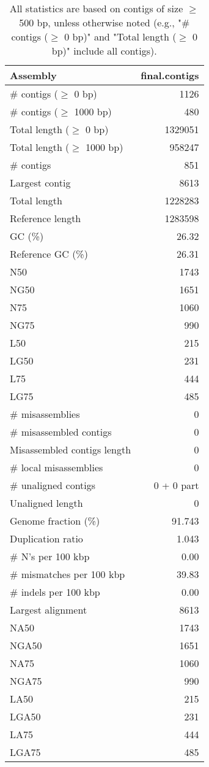 \documentclass[12pt,a4paper]{article}
\begin{document}
\begin{table}[ht]
\begin{center}
\caption{All statistics are based on contigs of size $\geq$ 500 bp, unless otherwise noted (e.g., "\# contigs ($\geq$ 0 bp)" and "Total length ($\geq$ 0 bp)" include all contigs).}
\begin{tabular}{|l*{1}{|r}|}
\hline
Assembly & final.contigs \\ \hline
\# contigs ($\geq$ 0 bp) & 1126 \\ \hline
\# contigs ($\geq$ 1000 bp) & 480 \\ \hline
Total length ($\geq$ 0 bp) & 1329051 \\ \hline
Total length ($\geq$ 1000 bp) & 958247 \\ \hline
\# contigs & 851 \\ \hline
Largest contig & 8613 \\ \hline
Total length & 1228283 \\ \hline
Reference length & 1283598 \\ \hline
GC (\%) & 26.32 \\ \hline
Reference GC (\%) & 26.31 \\ \hline
N50 & 1743 \\ \hline
NG50 & 1651 \\ \hline
N75 & 1060 \\ \hline
NG75 & 990 \\ \hline
L50 & 215 \\ \hline
LG50 & 231 \\ \hline
L75 & 444 \\ \hline
LG75 & 485 \\ \hline
\# misassemblies & 0 \\ \hline
\# misassembled contigs & 0 \\ \hline
Misassembled contigs length & 0 \\ \hline
\# local misassemblies & 0 \\ \hline
\# unaligned contigs & 0 + 0 part \\ \hline
Unaligned length & 0 \\ \hline
Genome fraction (\%) & 91.743 \\ \hline
Duplication ratio & 1.043 \\ \hline
\# N's per 100 kbp & 0.00 \\ \hline
\# mismatches per 100 kbp & 39.83 \\ \hline
\# indels per 100 kbp & 0.00 \\ \hline
Largest alignment & 8613 \\ \hline
NA50 & 1743 \\ \hline
NGA50 & 1651 \\ \hline
NA75 & 1060 \\ \hline
NGA75 & 990 \\ \hline
LA50 & 215 \\ \hline
LGA50 & 231 \\ \hline
LA75 & 444 \\ \hline
LGA75 & 485 \\ \hline
\end{tabular}
\end{center}
\end{table}
\end{document}
